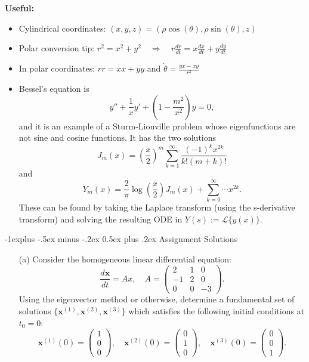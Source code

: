 \documentclass[10pt,landscape]{article}
\makeatletter
\renewcommand{\subsection}{\@startsection{subsection}{2}{0mm}%
                                {-1explus -.5ex minus -.2ex}%
                                {0.5ex plus .2ex}%
                                {\normalfont\normalsize\bfseries}}
\makeatother
\begin{document}
\begin{multicols}{2}
\textbf{Useful:}
\begin{itemize}
\item Cylindrical coordinates: $(x, y, z) = (\rho \cos(\theta), \rho \sin(\theta), z)$
\item Polar conversion tip: $r^2 = x^2 + y^2 \quad \Rightarrow \quad r \frac{dr}{dt} = x \frac{dx}{dt} + y \frac{dy}{dt}$

\item In polar coordinates: $r\dot{r} = x\dot{x} + y\dot{y}$ and $\dot{\theta} = \frac{\dot{y} x - \dot{x} y}{r^2}
$
\item Bessel's equation is
$$
y'' + \frac{1}{x} y' + \left( 1 - \frac{m^2}{x^2} \right) y = 0,
$$
and it is an example of a Sturm-Liouville problem whose eigenfunctions are not sine and cosine functions. It has the two solutions\\
$$
J_m(x) = \left( \frac{x}{2} \right)^m \sum_{k=1}^{\infty} \frac{(-1)^k x^{2k}}{k!(m + k)!}
$$
and
$$
Y_m(x) = \frac{2}{\pi} \log\left(\frac{x}{2}\right) J_m(x) + \sum_{k=0}^{\infty} \cdots x^{2k}.
$$
These can be found by taking the Laplace transform (using the s-derivative transform) and solving the resulting ODE in \( Y(s) := \mathcal{L}\{y(x)\} \).


\end{itemize}


\subsection{Assignment Solutions}

\begin{enumerate}
    \item[(a)]Consider the homogeneous linear differential equation:\\
    \[
    \frac{d\mathbf{x}}{dt} = Ax, \quad A = 
    \begin{pmatrix}
        2 & 1 & 0 \\
        -1 & 2 & 0 \\
        0 & 0 & -3
    \end{pmatrix}.
    \]
    Using the eigenvector method or otherwise, determine a fundamental set of solutions 
    \(\{\mathbf{x}^{(1)},\mathbf{x}^{(2)}, \mathbf{x}^{(3)}\}\) which satisfies the following initial conditions at \(t_0 = 0\):\\
    \[
    \mathbf{x}^{(1)}(0) = 
    \begin{pmatrix}
        1 \\
        0 \\
        0
    \end{pmatrix}, \quad
    \mathbf{x}^{(2)}(0) = 
    \begin{pmatrix}
        0 \\
        1 \\
        0
    \end{pmatrix}, \quad
    \mathbf{x}^{(3)}(0) = 
    \begin{pmatrix}
        0 \\
        0 \\
        1
    \end{pmatrix}.
    \]
    \end{enumerate}


\end{multicols}
\end{document}
